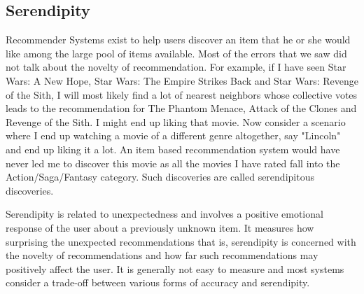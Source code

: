   \subsection{Serendipity}
  Recommender Systems exist to help users discover an item that he or she would like among the large pool of items available. Most of the errors that we saw did not talk about the novelty of recommendation. For example, if I have seen Star Wars: A New Hope, Star Wars: The Empire Strikes Back and Star Wars: Revenge of the Sith, I will most likely find a lot of nearest neighbors whose collective votes leads to the recommendation for The Phantom Menace, Attack of the Clones and Revenge of the Sith. I might end up liking that movie. Now consider a scenario where I end up watching a movie of a different genre altogether, say "Lincoln" and end up liking it a lot. An item based recommendation system would have never led me to discover this movie as all the movies I have rated fall into the Action/Saga/Fantasy category. Such discoveries are called serendipitous discoveries. 

Serendipity is related to unexpectedness and involves a positive emotional response of the user about a previously unknown item. It measures how surprising the unexpected recommendations that is, serendipity is concerned with the novelty of recommendations and how far such recommendations may positively affect the user. It is generally not easy to measure and most systems consider a trade-off between various forms of accuracy and serendipity. 
% 

